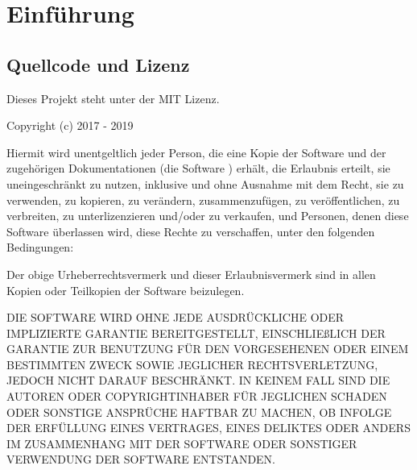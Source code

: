 \chapter{Einführung}
\label{cha:Einleitung}


\section{Quellcode und Lizenz}
\label{sec:licens_code}
Dieses Projekt steht unter der MIT Lizenz.

\vspace*{5mm} \noindent Copyright (c) 2017 - 2019 \autor

\vspace*{5mm} \noindent Hiermit wird unentgeltlich jeder Person, die eine Kopie der Software und der zugehörigen Dokumentationen (die \glqq Software \grqq) erhält, die Erlaubnis erteilt, sie uneingeschränkt zu nutzen, inklusive und ohne Ausnahme mit dem Recht, sie zu verwenden, zu kopieren, zu verändern, zusammenzufügen, zu veröffentlichen, zu verbreiten, zu unterlizenzieren und/oder zu verkaufen, und Personen, denen diese Software überlassen wird, diese Rechte zu verschaffen, unter den folgenden Bedingungen:

\noindent Der obige Urheberrechtsvermerk und dieser Erlaubnisvermerk sind in allen Kopien oder Teilkopien der Software beizulegen.

\vspace*{5mm} \noindent DIE SOFTWARE WIRD OHNE JEDE AUSDRÜCKLICHE ODER IMPLIZIERTE GARANTIE BEREITGESTELLT, EINSCHLIEßLICH DER GARANTIE ZUR BENUTZUNG FÜR DEN VORGESEHENEN ODER EINEM BESTIMMTEN ZWECK SOWIE JEGLICHER RECHTSVERLETZUNG, JEDOCH NICHT DARAUF BESCHRÄNKT. IN KEINEM FALL SIND DIE AUTOREN ODER COPYRIGHTINHABER FÜR JEGLICHEN SCHADEN ODER SONSTIGE ANSPRÜCHE HAFTBAR ZU MACHEN, OB INFOLGE DER ERFÜLLUNG EINES VERTRAGES, EINES DELIKTES ODER ANDERS IM ZUSAMMENHANG MIT DER SOFTWARE ODER SONSTIGER VERWENDUNG DER SOFTWARE ENTSTANDEN.

